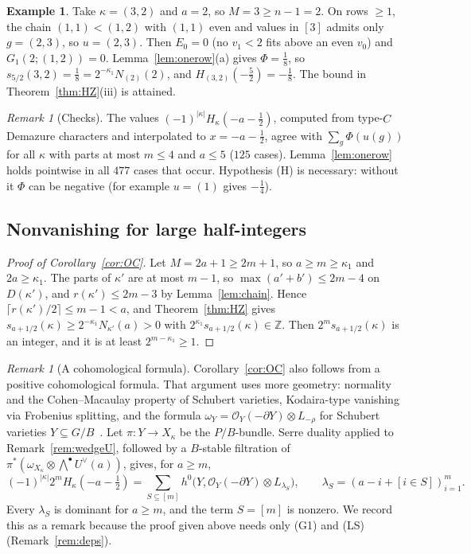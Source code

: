 \documentclass[11pt]{amsart}
\theoremstyle{definition}
\newtheorem{example}[theorem]{Example}
\theoremstyle{remark}
\newtheorem{remark}[theorem]{Remark}
\newcommand{\cO}{\mathcal{O}}
\newcommand{\Z}{\mathbb{Z}}
\begin{document}
\begin{example}
Take $\kappa=(3,2)$ and $a=2$, so $M=3\ge n-1=2$. On rows $\ge1$, the chain $(1,1)<(1,2)$ with
$(1,1)$ even and values in $[3]$ admits only $g=(2,3)$, so $u=(2,3)$. Then $E_0=0$ (no
$v_1<2$ fits above an even $v_0$) and $G_1(2;(1,2))=0$. Lemma~\ref{lem:onerow}(a) gives
$\Phi=\tfrac18$, so $s_{5/2}(3,2)=\tfrac18=2^{-\kappa_1}N_{(2)}(2)$, and
$H_{(3,2)}(-\tfrac52)=-\tfrac18$. The bound in Theorem~\ref{thm:HZ}(iii) is attained.
\end{example}

\begin{remark}[Checks]
The values $(-1)^{|\kappa|}H_\kappa(-a-\tfrac12)$, computed from type-$C$ Demazure characters
and interpolated to $x=-a-\tfrac12$, agree with $\sum_g\Phi(u(g))$ for all $\kappa$ with parts at
most $m\le4$ and $a\le5$ ($125$ cases). Lemma~\ref{lem:onerow} holds pointwise in all $477$ cases
that occur. Hypothesis (H) is necessary: without it $\Phi$ can be negative (for example $u=(1)$
gives $-\tfrac14$).
\end{remark}

\subsection{Nonvanishing for large half-integers}

\begin{proof}[Proof of Corollary~\ref{cor:OC}]
Let $M=2a+1\ge2m+1$, so $a\ge m\ge\kappa_1$ and $2a\ge\kappa_1$. The parts of $\kappa'$ are at
most $m-1$, so $\max(a'+b')\le2m-4$ on $D(\kappa')$, and $r(\kappa')\le2m-3$ by
Lemma~\ref{lem:chain}. Hence $\lceil r(\kappa')/2\rceil\le m-1<a$, and
Theorem~\ref{thm:HZ} gives $s_{a+1/2}(\kappa)\ge2^{-\kappa_1}N_{\kappa'}(a)>0$ with
$2^{\kappa_1}s_{a+1/2}(\kappa)\in\Z$. Then $2^ms_{a+1/2}(\kappa)$ is an integer, and it is at
least $2^{m-\kappa_1}\ge1$.
\end{proof}

\begin{remark}[A cohomological formula]\label{rem:serre}
Corollary~\ref{cor:OC} also follows from a positive cohomological formula. That argument uses
more geometry: normality and the Cohen--Macaulay property of Schubert varieties, Kodaira-type
vanishing via Frobenius splitting, and the formula $\omega_Y=\cO_Y(-\partial Y)\otimes L_{-\rho}$
for Schubert varieties $Y\subseteq G/B$~\cite[Ch.~3]{BK05}. Let $\pi\colon Y\to X_\kappa$ be the
$P/B$-bundle. Serre duality applied to Remark~\ref{rem:wedgeU}, followed by a $B$-stable
filtration of $\pi^*(\omega_{X_\kappa}\otimes\bigwedge^\bullet U^\vee(a))$, gives, for $a\ge m$,
\[ (-1)^{|\kappa|}2^mH_\kappa(-a-\tfrac12)=\sum_{S\subseteq[m]}h^0\bigl(Y,\cO_Y(-\partial Y)\otimes L_{\lambda_S}\bigr),\qquad\lambda_S=(a-i+[i\in S])_{i=1}^m. \]
Every $\lambda_S$ is dominant for $a\ge m$, and the term $S=[m]$ is nonzero. We record this as a
remark because the proof given above needs only (G1) and (LS) (Remark~\ref{rem:deps}).
\end{remark}
\end{document}
